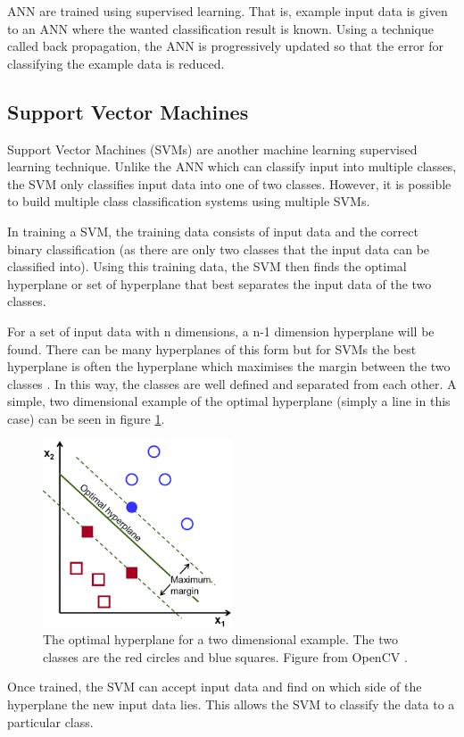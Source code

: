 ANN are trained using supervised learning. That is, example input data is given to an ANN where the wanted classification result is known. Using a technique called back propagation, the ANN is progressively updated so that the error for classifying the example data is reduced.  


\subsection{Support Vector Machines}
\label{SVMAppendix}

Support Vector Machines (SVMs) are another machine learning supervised learning technique. Unlike the ANN which can classify input into multiple classes, the SVM only classifies input data into one of two classes. However, it is possible to build  multiple class classification systems using multiple SVMs. 

In training a SVM, the training data consists of input data and the correct binary classification (as there are only two classes that the input data can be classified into).  Using this training data, the SVM then finds the optimal hyperplane or set of hyperplane that best separates the input data of the two classes.  \cite{Jordan2008}

For a set of input data with n dimensions, a n-1 dimension hyperplane will be found. There can be many hyperplanes of this form but for SVMs the best hyperplane is often the hyperplane which maximises the margin between the two classes \cite{Jordan2008}. In this way, the classes are well defined and separated from each other. A simple, two dimensional example of the optimal hyperplane (simply a line in this case) can be seen in figure \ref{SVM}.

\begin{figure}[ht!]
\begin{center}
\leavevmode
\includegraphics[width=0.5\textwidth]{images/svm.png}
\end{center}
\caption[Example Support Vector Machine]{The optimal hyperplane for a two dimensional example. The two classes are the red circles and blue squares. Figure from OpenCV \cite{SVM}.}
\label{SVM}
\end{figure}

Once trained, the SVM can accept input data and find on which side of the hyperplane the new input data lies. This allows the SVM to classify the data to a particular class. 

